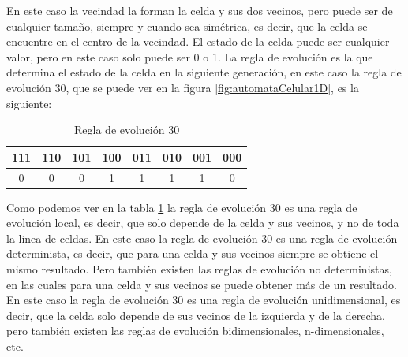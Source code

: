     \vskip 0.5cm
    En este caso la vecindad la forman la celda y sus dos vecinos, pero puede ser de cualquier tama\~no, siempre y cuando
        sea sim\'etrica, es decir, que la celda se encuentre en el centro de la vecindad. El estado de la celda puede ser
        cualquier valor, pero en este caso solo puede ser 0 o 1. La regla de evoluci\'on es la que determina el estado de
        la celda en la siguiente generaci\'on, en este caso la regla de evoluci\'on 30, que se puede ver en la figura
        \ref{fig:automataCelular1D}, es la siguiente:
        \begin{table}[h!]
            \centering
            \begin{tabular}{|c|c|c|c|c|c|c|c|}
                \hline
                \textbf{111} & \textbf{110} & \textbf{101} & \textbf{100} & \textbf{011} & \textbf{010} & \textbf{001} & \textbf{000} \\
                \hline
                0 & 0 & 0 & 1 & 1 & 1 & 1 & 0 \\
                \hline
            \end{tabular}
            \caption{Regla de evoluci\'on 30}
            \label{tab:reglaEvolucion30}
        \end{table}
    \vskip 0.5cm
    Como podemos ver en la tabla \ref{tab:reglaEvolucion30} la regla de evoluci\'on 30 es una regla de evoluci\'on local, 
        es decir, que solo depende de la celda y sus vecinos, y no de toda la linea de celdas. En este caso la regla de evoluci\'on
        30 es una regla de evoluci\'on determinista, es decir, que para una celda y sus vecinos siempre se obtiene el mismo resultado.
        Pero tambi\'en existen las reglas de evoluci\'on no deterministas, en las cuales para una celda y sus vecinos se puede obtener
        m\'as de un resultado. En este caso la regla de evoluci\'on 30 es una regla de evoluci\'on unidimensional, es decir, que la
        celda solo depende de sus vecinos de la izquierda y de la derecha, pero tambi\'en existen las reglas de evoluci\'on
        bidimensionales, n-dimensionales, etc.
    \vskip 0.5cm
